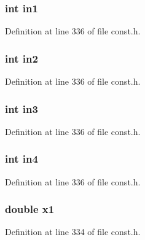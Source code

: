 \subsubsection[{in1}]{\setlength{\rightskip}{0pt plus 5cm}int in1}\label{structcondsq_a774ddc65536ce3a5cacc80197ade1d28}


Definition at line 336 of file const.\+h.

\hypertarget{structcondsq_a291f7ca3921946eaa5aa1b4b2218c081}{}
\subsubsection[{in2}]{\setlength{\rightskip}{0pt plus 5cm}int in2}\label{structcondsq_a291f7ca3921946eaa5aa1b4b2218c081}


Definition at line 336 of file const.\+h.

\hypertarget{structcondsq_a0317c615b473f941166fb655fbfacab8}{}
\subsubsection[{in3}]{\setlength{\rightskip}{0pt plus 5cm}int in3}\label{structcondsq_a0317c615b473f941166fb655fbfacab8}


Definition at line 336 of file const.\+h.

\hypertarget{structcondsq_aaf16c716fbcf452c1feef9dc6a3b7322}{}
\subsubsection[{in4}]{\setlength{\rightskip}{0pt plus 5cm}int in4}\label{structcondsq_aaf16c716fbcf452c1feef9dc6a3b7322}


Definition at line 336 of file const.\+h.

\hypertarget{structcondsq_ac75b803b570527306e1e744bfb7a604f}{}
\subsubsection[{x1}]{\setlength{\rightskip}{0pt plus 5cm}double x1}\label{structcondsq_ac75b803b570527306e1e744bfb7a604f}


Definition at line 334 of file const.\+h.

\hypertarget{structcondsq_adcf04f5f1964d18b332643939561da0d}{}

